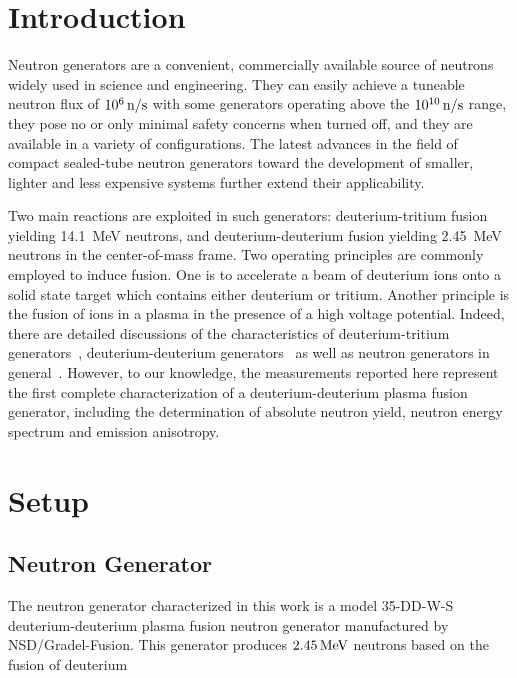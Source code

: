 
\section{Introduction}

Neutron generators are a convenient, commercially available source of neutrons widely used in science and engineering. They can easily achieve a tuneable neutron flux of $10^6\, \mathrm{n/s}$ with some generators operating above the $10^{10}\, \mathrm{n/s}$ range, they pose no or only minimal safety concerns when turned off, and they are available in a variety of configurations. The latest advances in the field of compact sealed-tube neutron generators toward the development of smaller, lighter and less expensive systems further extend their applicability.

Two main reactions are exploited in such generators: deuterium-tritium fusion yielding \SI{14.1}{MeV} neutrons, and deuterium-deuterium fusion yielding \SI{2.45}{MeV} neutrons in the center-of-mass frame. Two operating principles are commonly employed to induce fusion. One is to accelerate a beam of deuterium ions onto a solid state target which contains either deuterium or tritium. Another principle is the fusion of ions in a plasma in the presence of a high voltage potential. Indeed, there are detailed discussions of the characteristics of deuterium-tritium generators~\cite{guillame1971}, deuterium-deuterium generators~\cite{Miley1997, Miley1999, Miley2000} as well as neutron generators in general~\cite{CRC,chernikova}. However, to our knowledge, the measurements reported here represent the first complete characterization of a deuterium-deuterium plasma fusion generator, including the determination of absolute neutron yield, neutron energy spectrum and emission anisotropy.

\section{Setup} \label{sec_setup}

\subsection{Neutron Generator}

The neutron generator characterized in this work is a model 35-DD-W-S deuterium-deuterium plasma fusion neutron generator manufactured by NSD/Gradel-Fusion. This generator produces $2.45\, \mathrm{MeV}$ neutrons based on the fusion of deuterium

